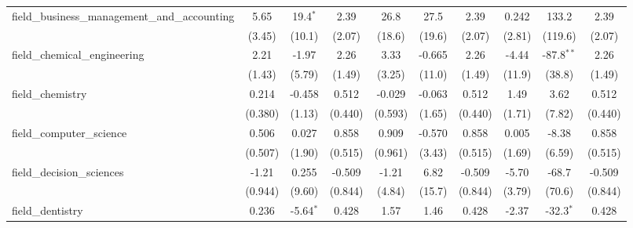\begin{tabular}{lccccccccc}
   field\_business\_management\_and\_accounting                & 5.65           & 19.4$^{*}$     & 2.39           & 26.8           & 27.5          & 2.39           & 0.242          & 133.2          & 2.39\\   
                                                               & (3.45)         & (10.1)         & (2.07)         & (18.6)         & (19.6)        & (2.07)         & (2.81)         & (119.6)        & (2.07)\\   
   field\_chemical\_engineering                                & 2.21           & -1.97          & 2.26           & 3.33           & -0.665        & 2.26           & -4.44          & -87.8$^{**}$   & 2.26\\   
                                                               & (1.43)         & (5.79)         & (1.49)         & (3.25)         & (11.0)        & (1.49)         & (11.9)         & (38.8)         & (1.49)\\   
   field\_chemistry                                            & 0.214          & -0.458         & 0.512          & -0.029         & -0.063        & 0.512          & 1.49           & 3.62           & 0.512\\   
                                                               & (0.380)        & (1.13)         & (0.440)        & (0.593)        & (1.65)        & (0.440)        & (1.71)         & (7.82)         & (0.440)\\   
   field\_computer\_science                                    & 0.506          & 0.027          & 0.858          & 0.909          & -0.570        & 0.858          & 0.005          & -8.38          & 0.858\\   
                                                               & (0.507)        & (1.90)         & (0.515)        & (0.961)        & (3.43)        & (0.515)        & (1.69)         & (6.59)         & (0.515)\\   
   field\_decision\_sciences                                   & -1.21          & 0.255          & -0.509         & -1.21          & 6.82          & -0.509         & -5.70          & -68.7          & -0.509\\   
                                                               & (0.944)        & (9.60)         & (0.844)        & (4.84)         & (15.7)        & (0.844)        & (3.79)         & (70.6)         & (0.844)\\   
   field\_dentistry                                            & 0.236          & -5.64$^{*}$    & 0.428          & 1.57           & 1.46          & 0.428          & -2.37          & -32.3$^{*}$    & 0.428\\   

\end{tabular}
